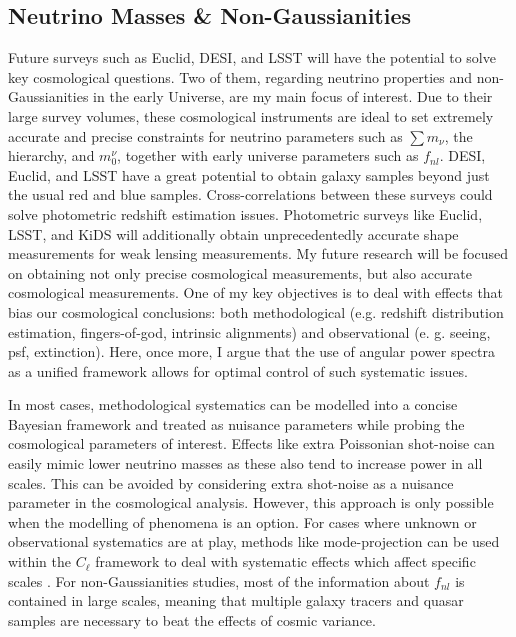 \subsection{Neutrino Masses \& Non-Gaussianities}\label{Sec:Concl:NeutrinoFnl}
Future surveys such as Euclid, DESI, and LSST will have the potential to solve key cosmological questions. Two of them, regarding neutrino properties and non-Gaussianities in the early Universe, are my main focus of interest. Due to their large survey volumes, these cosmological instruments are ideal to set extremely accurate and precise constraints for neutrino parameters such as $\sum m_{\nu}$, the hierarchy, and $m_{0}^{\nu}$, together with early universe parameters such as $f_{nl}$. DESI, Euclid, and LSST have a great potential to obtain galaxy samples beyond just the usual red and blue samples. Cross-correlations between these surveys could solve photometric redshift estimation issues. Photometric surveys like Euclid, LSST, and KiDS will additionally obtain unprecedentedly accurate shape measurements for weak lensing measurements. My future research will be focused on obtaining not only precise cosmological measurements, but also accurate cosmological measurements. One of my key objectives is to deal with effects that bias our cosmological conclusions: both methodological (e.g. redshift distribution estimation, fingers-of-god, intrinsic alignments) and observational (e. g. seeing, psf, extinction). Here, once more, I argue that the use of angular power spectra as a unified framework allows for optimal control of such systematic issues.

\qquad In most cases, methodological systematics can be modelled into a concise Bayesian framework and treated as nuisance parameters while probing the cosmological parameters of interest. Effects like extra Poissonian shot-noise can easily mimic lower neutrino masses as these also tend to increase power in all scales. This can be avoided by considering extra shot-noise as a nuisance parameter in the cosmological analysis. However, this approach is only possible when the modelling of phenomena is an option. For cases where unknown or observational systematics are at play, methods like mode-projection can be used within the $C_{\ell}$ framework to deal with systematic effects which affect specific scales \cite{Boris2013}. For non-Gaussianities studies, most of the information about $f_{nl}$ is contained in large scales, meaning that multiple galaxy tracers and quasar samples are necessary to beat the effects of cosmic variance.

